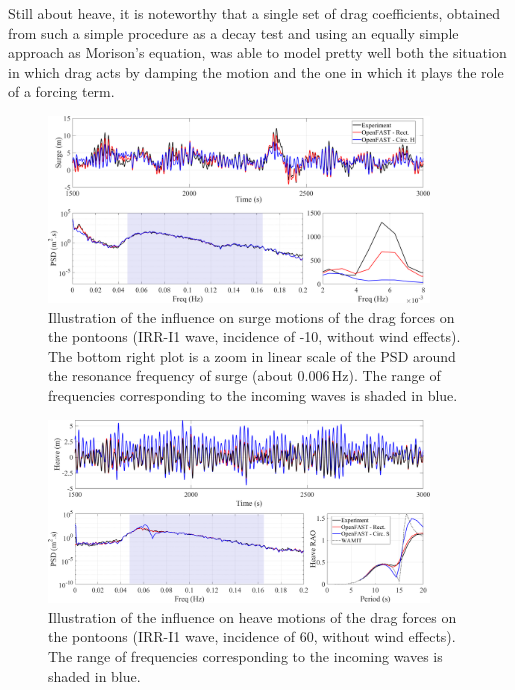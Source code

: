 Still about heave, it is noteworthy that a single set of drag coefficients, obtained from such a simple procedure as a decay test and using an equally simple approach as Morison's equation, was able to model pretty well both the situation in which drag acts by damping the motion and the one in which it plays the role of a forcing term.
\begin{figure}[!hbtp]
	\centering
	\includegraphics[width=0.9\textwidth]{./figures/ptfmsurge-drag_pontoon.png}	
	\caption{Illustration of the influence on surge motions of the drag forces on the pontoons (IRR-I1 wave, incidence of -10\textdegree{}, without wind effects). The bottom right plot is a zoom in linear scale of the PSD around the resonance frequency of surge (about $0.006\,\text{Hz}$). The range of frequencies corresponding to the incoming waves is shaded in blue.} \label{fig:exp_vs_num:drag:ptfmsurge}
\end{figure}

\begin{figure}[!hbtp]
	\centering
	\includegraphics[width=0.9\textwidth]{./figures/ptfmheave-drag_pontoon.png}	
	\caption{Illustration of the influence on heave motions of the drag forces on the pontoons (IRR-I1 wave, incidence of 60\textdegree{}, without wind effects). The range of frequencies corresponding to the incoming waves is shaded in blue.} \label{fig:exp_vs_num:drag:ptfmheave}%
\end{figure}%








